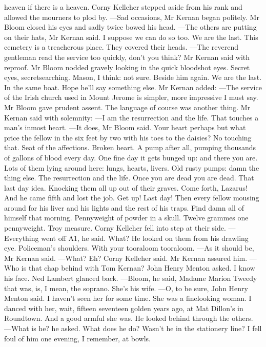 \documentclass{article}
\begin{document}
heaven if there is a heaven.
Corny Kelleher stepped aside from his rank and allowed the mourners to
plod by.
—Sad occasions, Mr Kernan began politely.
Mr Bloom closed his eyes and sadly twice bowed his head.
—The others are putting on their hats, Mr Kernan said. I suppose we
can do so too. We are the last. This cemetery is a treacherous place.
They covered their heads.
—The reverend gentleman read the service too quickly, don’t you
think? Mr Kernan said with reproof.
Mr Bloom nodded gravely looking in the quick bloodshot eyes. Secret
eyes, secretsearching. Mason, I think: not sure. Beside him again. We
are the last. In the same boat. Hope he’ll say something else.
Mr Kernan added:
—The service of the Irish church used in Mount Jerome is simpler, more
impressive I must say.
Mr Bloom gave prudent assent. The language of course was another thing.
Mr Kernan said with solemnity:
—I am the resurrection and the life. That touches a man’s inmost
heart.
—It does, Mr Bloom said.
Your heart perhaps but what price the fellow in the six feet by two
with his toes to the daisies? No touching that. Seat of the affections.
Broken heart. A pump after all, pumping thousands of gallons of blood
every day. One fine day it gets bunged up: and there you are. Lots of
them lying around here: lungs, hearts, livers. Old rusty pumps: damn
the thing else. The resurrection and the life. Once you are dead you are
dead. That last day idea. Knocking them all up out of their graves. Come
forth, Lazarus! And he came fifth and lost the job. Get up! Last day!
Then every fellow mousing around for his liver and his lights and the
rest of his traps. Find damn all of himself that morning. Pennyweight of
powder in a skull. Twelve grammes one pennyweight. Troy measure.
Corny Kelleher fell into step at their side.
—Everything went off A1, he said. What?
He looked on them from his drawling eye. Policeman’s shoulders. With
your tooraloom tooraloom.
—As it should be, Mr Kernan said.
—What? Eh? Corny Kelleher said.
Mr Kernan assured him.
—Who is that chap behind with Tom Kernan? John Henry Menton asked. I
know his face.
Ned Lambert glanced back.
—Bloom, he said, Madame Marion Tweedy that was, is, I mean, the
soprano. She’s his wife.
—O, to be sure, John Henry Menton said. I haven’t seen her for some
time. She was a finelooking woman. I danced with her, wait, fifteen
seventeen golden years ago, at Mat Dillon’s in Roundtown. And a good
armful she was.
He looked behind through the others.
—What is he? he asked. What does he do? Wasn’t he in the stationery
line? I fell foul of him one evening, I remember, at bowls.
\end{document}
